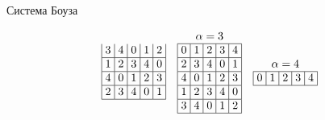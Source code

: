 \documentclass[8pt, hyperref={pdftex,unicode}]{beamer}
\begin{document}
\begin{frame}{Система Боуза}
\begin{block}{}
\begin{gather*}
\begin{array}{|>{\hspace{-2pt}}c<{\hspace{-2pt}}|>{\hspace{-2pt}}c<{\hspace{-2pt}}|>{\hspace{-2pt}}c<{\hspace{-2pt}}|>{\hspace{-2pt}}c<{\hspace{-2pt}}|>{\hspace{-2pt}}c<{\hspace{-2pt}}|}
                3 & 4 & 0 & 1 & 2              \\ \hline
                1 & 2 & 3 & 4 & 0              \\ \hline
                4 & 0 & 1 & 2 & 3              \\ \hline
                2 & 3 & 4 & 0 & 1              \\ \hline
            \end{array}\hspace{1em}
            \begin{array}{|>{\hspace{-2pt}}c<{\hspace{-2pt}}|>{\hspace{-2pt}}c<{\hspace{-2pt}}|>{\hspace{-2pt}}c<{\hspace{-2pt}}|>{\hspace{-2pt}}c<{\hspace{-2pt}}|>{\hspace{-2pt}}c<{\hspace{-2pt}}|}
                \multicolumn{5}{c}{\alpha = 3} \\ \hline
                0 & 1 & 2 & 3 & 4              \\ \hline
                2 & 3 & 4 & 0 & 1              \\ \hline
                4 & 0 & 1 & 2 & 3              \\ \hline
                1 & 2 & 3 & 4 & 0              \\ \hline
                3 & 4 & 0 & 1 & 2              \\ \hline
            \end{array}\hspace{1em}
            \begin{array}{|>{\hspace{-2pt}}c<{\hspace{-2pt}}|>{\hspace{-2pt}}c<{\hspace{-2pt}}|>{\hspace{-2pt}}c<{\hspace{-2pt}}|>{\hspace{-2pt}}c<{\hspace{-2pt}}|>{\hspace{-2pt}}c<{\hspace{-2pt}}|}
                \multicolumn{5}{c}{\alpha = 4} \\ \hline
                0 & 1 & 2 & 3 & 4              \\ \hline

\end{array}
\end{gather*}
\end{block}
\end{frame}
\end{document}
